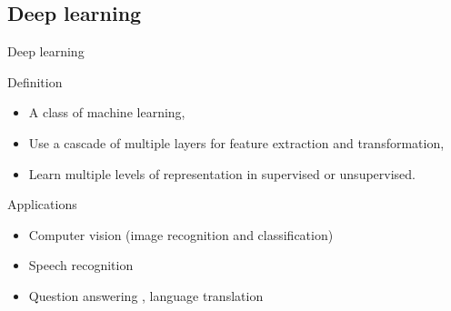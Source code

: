 \documentclass[10pt]{beamer}
\begin{document}
\subsection{Deep learning}
\begin{frame}{Deep learning}{}
	\begin{block}{Definition}
		\begin{itemize}
			\item A class of machine learning,
			\item Use a cascade of multiple layers for feature extraction and transformation,
			\item Learn multiple levels of representation in supervised or unsupervised.
		\end{itemize}
	\end{block}
	\pause
	\begin{block}{Applications}
		\begin{itemize}
			\item Computer vision (image recognition and classification)
			\item Speech recognition
			\item Question answering \cite{}, language translation\cite{}
		\end{itemize}
	\end{block}
\end{frame}
\end{document}
